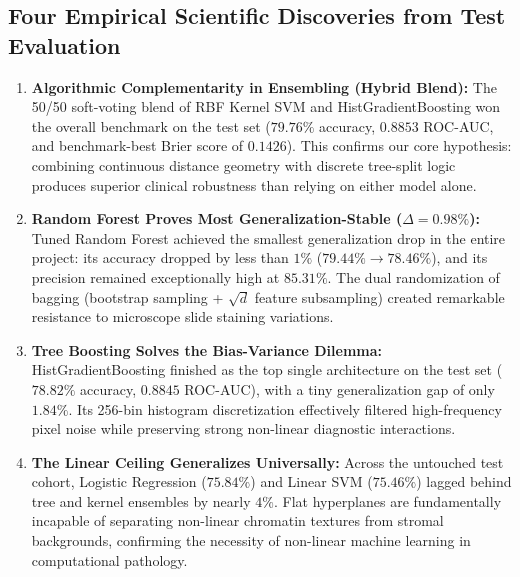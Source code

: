 \documentclass[11pt,a4paper]{article}
\begin{document}
\subsection{Four Empirical Scientific Discoveries from Test Evaluation}
\begin{enumerate}[leftmargin=*]
    \item \textbf{Algorithmic Complementarity in Ensembling (Hybrid Blend):}
    The 50/50 soft-voting blend of RBF Kernel SVM and HistGradientBoosting won the overall benchmark on the test set ($\mathbf{79.76\%}$ accuracy, $\mathbf{0.8853}$ ROC-AUC, and benchmark-best Brier score of $\mathbf{0.1426}$). This confirms our core hypothesis: combining continuous distance geometry with discrete tree-split logic produces superior clinical robustness than relying on either model alone.
    
    \item \textbf{Random Forest Proves Most Generalization-Stable ($\Delta = 0.98\%$):}
    Tuned Random Forest achieved the smallest generalization drop in the entire project: its accuracy dropped by less than $1\%$ ($79.44\% \to 78.46\%$), and its precision remained exceptionally high at $\mathbf{85.31\%}$. The dual randomization of bagging (bootstrap sampling + $\sqrt{d}$ feature subsampling) created remarkable resistance to microscope slide staining variations.
    
    \item \textbf{Tree Boosting Solves the Bias-Variance Dilemma:}
    HistGradientBoosting finished as the top single architecture on the test set ($\mathbf{78.82\%}$ accuracy, $0.8845$ ROC-AUC), with a tiny generalization gap of only $1.84\%$. Its 256-bin histogram discretization effectively filtered high-frequency pixel noise while preserving strong non-linear diagnostic interactions.
    
    \item \textbf{The Linear Ceiling Generalizes Universally:}
    Across the untouched test cohort, Logistic Regression ($75.84\%$) and Linear SVM ($75.46\%$) lagged behind tree and kernel ensembles by nearly $4\%$. Flat hyperplanes are fundamentally incapable of separating non-linear chromatin textures from stromal backgrounds, confirming the necessity of non-linear machine learning in computational pathology.
\end{enumerate}



\end{document}
